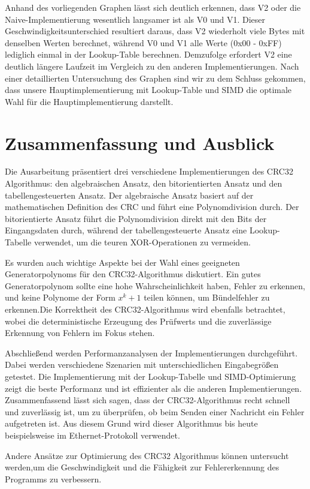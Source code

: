 \documentclass[course=erap]{aspdoc}
\begin{document}
    Anhand des vorliegenden Graphen lässt sich deutlich erkennen, dass V2 oder die Naive-Implementierung wesentlich langsamer ist als V0 und V1. Dieser Geschwindigkeitsunterschied resultiert daraus, dass V2 wiederholt viele Bytes mit denselben Werten berechnet, während V0 und V1 alle Werte (0x00 - 0xFF) lediglich einmal in der Lookup-Table berechnen. Demzufolge erfordert V2 eine deutlich längere Laufzeit im Vergleich zu den anderen Implementierungen. Nach einer detaillierten Untersuchung des Graphen sind wir zu dem Schluss gekommen, dass unsere Hauptimplementierung mit Lookup-Table und SIMD die optimale Wahl für die Hauptimplementierung darstellt.

\section{Zusammenfassung und Ausblick}

    Die Ausarbeitung präsentiert drei verschiedene Implementierungen des CRC32 Algorithmus: den algebraischen Ansatz, den bitorientierten Ansatz und den tabellengesteuerten Ansatz. Der algebraische Ansatz basiert auf der mathematischen Definition des CRC und führt eine Polynomdivision durch. Der bitorientierte Ansatz führt die Polynomdivision direkt mit den Bits der Eingangsdaten durch, während der tabellengesteuerte Ansatz eine Lookup-Tabelle verwendet, um die teuren XOR-Operationen zu vermeiden.

    Es wurden auch wichtige Aspekte bei der Wahl eines geeigneten Generatorpolynoms für den CRC32-Algorithmus diskutiert. Ein gutes Generatorpolynom sollte eine hohe Wahrscheinlichkeit haben, Fehler zu erkennen, und keine Polynome der Form $x^k+1$ teilen können, um Bündelfehler zu erkennen.Die Korrektheit des CRC32-Algorithmus wird ebenfalls betrachtet, wobei die deterministische Erzeugung des Prüfwerts und die zuverlässige Erkennung von Fehlern im Fokus stehen.

    Abschließend werden Performanzanalysen der Implementierungen durchgeführt. Dabei werden verschiedene Szenarien mit unterschiedlichen Eingabegrößen getestet. Die Implementierung mit der Lookup-Tabelle und SIMD-Optimierung zeigt die beste Performanz und ist effizienter als die anderen Implementierungen.\\

    Zusammenfassend lässt sich sagen, dass der CRC32-Algorithmus recht schnell und zuverlässig ist, um zu überprüfen, ob beim Senden einer Nachricht ein Fehler aufgetreten ist. Aus diesem Grund wird dieser Algorithmus bis heute beispielsweise im Ethernet-Protokoll verwendet.

    Andere Ansätze zur Optimierung des CRC32 Algorithmus können untersucht werden,um die Geschwindigkeit und die Fähigkeit zur Fehlererkennung des Programms zu verbessern.




{}
\end{document}
